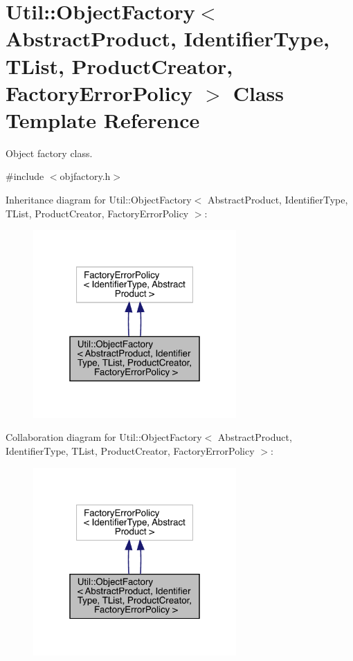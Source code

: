 \hypertarget{classUtil_1_1ObjectFactory}{}\section{Util\+:\+:Object\+Factory$<$ Abstract\+Product, Identifier\+Type, T\+List, Product\+Creator, Factory\+Error\+Policy $>$ Class Template Reference}
\label{classUtil_1_1ObjectFactory}


Object factory class.  




{\ttfamily \#include $<$objfactory.\+h$>$}



Inheritance diagram for Util\+:\+:Object\+Factory$<$ Abstract\+Product, Identifier\+Type, T\+List, Product\+Creator, Factory\+Error\+Policy $>$\+:\nopagebreak
\begin{figure}[H]
\begin{center}
\leavevmode
\includegraphics[width=220pt]{d9/d7d/classUtil_1_1ObjectFactory__inherit__graph}
\end{center}
\end{figure}


Collaboration diagram for Util\+:\+:Object\+Factory$<$ Abstract\+Product, Identifier\+Type, T\+List, Product\+Creator, Factory\+Error\+Policy $>$\+:\nopagebreak
\begin{figure}[H]
\begin{center}
\leavevmode
\includegraphics[width=220pt]{d6/d0b/classUtil_1_1ObjectFactory__coll__graph}
\end{center}
\end{figure}
